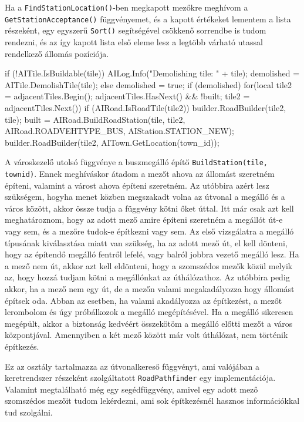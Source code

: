Ha a \texttt{FindStationLocation()}-ben megkapott mezőkre meghívom a \\ \texttt{GetStationAcceptance()} függvényemet, és a kapott értékeket lementem a lista részeként, egy egyszerű \texttt{Sort()} segítségével csökkenő sorrendbe is tudom rendezni, és az így kapott lista első eleme lesz a legtöbb várható utassal rendelkező állomás pozíciója.

\begin{cpp}
if (!AITile.IsBuildable(tile)) {
  AILog.Info("Demolishing tile: " + tile);
  demolished = AITile.DemolishTile(tile);
} else {
  demolished = true;
}
if (demolished) {
  for(local tile2 = adjacentTiles.Begin(); 
   adjacentTiles.HasNext() && !built; tile2 = adjacentTiles.Next()) {
	if (AIRoad.IsRoadTile(tile2)) {
      builder.RoadBuilder(tile2, tile);
      built = AIRoad.BuildRoadStation(tile, tile2,
      AIRoad.ROADVEHTYPE_BUS, AIStation.STATION_NEW);
      builder.RoadBuilder(tile2, AITown.GetLocation(town_id));
    }
  }
}
\end{cpp}

A városkezelő utolsó függvénye a buszmegálló építő \texttt{BuildStation(tile, townid)}. Ennek meghíváskor átadom a mezőt ahova az állomást szeretném építeni, valamint a várost ahova építeni szeretném. Az utóbbira azért lesz szükségem, hogyha menet közben megszakadt volna az útvonal a megálló és a város között, akkor össze tudja a függvény kötni őket úttal. Itt már csak azt kell meghatároznom, hogy az adott mező amire építeni szeretném a megállót út-e vagy sem, és a mezőre tudok-e építkezni vagy sem. Az első vizsgálatra a megálló típusának kiválasztása miatt van szükség, ha az adott mező út, el kell dönteni, hogy az építendő megálló fentről lefelé, vagy balról jobbra vezető megálló lesz. Ha a mező nem út, akkor azt kell eldönteni, hogy a szomszédos mezők közül melyik az, hogy hozzá tudjam kötni a megállónkat az úthálózathoz. Az utóbbira pedig akkor, ha a mező nem egy út, de a mezőn valami megakadályozza hogy állomást építsek oda. Abban az esetben, ha valami akadályozza az építkezést, a mezőt lerombolom és úgy próbálkozok a megálló megépítésével. Ha a megálló sikeresen megépült, akkor a biztonság kedvéért összekötöm a megálló előtti mezőt a város központjával. Amennyiben a két mező között már volt úthálózat, nem történik építkezés.


Ez az osztály tartalmazza az útvonalkereső függvényt, ami valójában a keretrendszer részeként szolgáltatott \texttt{RoadPathfinder} egy implementációja. Valamint megtalálható még egy segédfüggvény, amivel egy adott mező szomszédos mezőit tudom lekérdezni, ami sok építkezésnél hasznos információkkal tud szolgálni.


